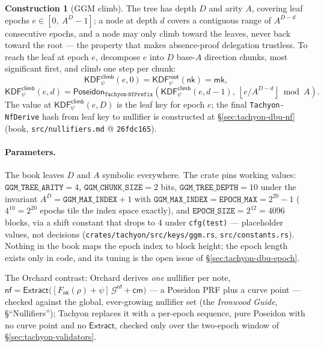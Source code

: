 \documentclass[11pt,a4paper]{article}
\theoremstyle{definition}
\newtheorem{construction}[theorem]{Construction}
\newcommand{\nfsym}{\mathsf{nf}}
\newcommand{\cmsym}{\mathsf{cm}}
\newcommand{\Extract}{\ensuremath{\mathsf{Extract}}}
\newcommand{\nksym}{\ensuremath{\mathsf{nk}}}
\begin{document}
\begin{construction}[GGM climb]\label{def:tachyon-design-climb}
The tree has depth $D$ and arity $A$, covering leaf epochs
$e \in [0,\ A^D - 1]$; a node at depth $d$ covers a contiguous range of
$A^{D-d}$ consecutive epochs, and a node may only climb toward the leaves,
never back toward the root --- the property that makes absence-proof
delegation trustless. To reach the leaf at epoch $e$, decompose $e$ into
$D$ base-$A$ direction chunks, most significant first, and
climb one step per chunk:
\[
\mathsf{KDF}^{\mathsf{climb}}_\psi(e, 0) =
  \mathsf{KDF}^{\mathsf{root}}_\psi(\nksym) = \mathsf{mk},
\]
\[
\mathsf{KDF}^{\mathsf{climb}}_\psi(e, d) =
  \mathsf{Poseidon}_{\texttt{Tachyon-NfPrefix}}\!\left(
    \mathsf{KDF}^{\mathsf{climb}}_\psi(e, d-1),\
    \left\lfloor e / A^{D-d} \right\rfloor \bmod A
  \right).
\]
The value at $\mathsf{KDF}^{\mathsf{climb}}_\psi(e, D)$ is the leaf key for
epoch $e$; the final \texttt{Tachyon-NfDerive} hash from leaf key to
nullifier is constructed at \S\ref{sec:tachyon-dbu-nf} (book,
\texttt{src/nullifiers.md} @ \texttt{26fdc165}).
\end{construction}

\paragraph{Parameters.} The book leaves $D$ and $A$ symbolic everywhere.
The crate pins working values: $\texttt{GGM\_TREE\_ARITY} = 4$,
$\texttt{GGM\_CHUNK\_SIZE} = 2$ bits, $\texttt{GGM\_TREE\_DEPTH} = 10$
under the invariant $A^D = \texttt{GGM\_MAX\_INDEX} + 1$ with
$\texttt{GGM\_MAX\_INDEX} = \texttt{EPOCH\_MAX} = 2^{20} - 1$ ($4^{10} =
2^{20}$ epochs tile the index space exactly), and $\texttt{EPOCH\_SIZE} =
2^{12} = 4096$ blocks, via a shift constant that drops to $4$ under
\texttt{cfg(test)} --- placeholder values, not decisions
(\texttt{crates/tachyon/src/keys/ggm.rs}, \texttt{src/constants.rs}).
Nothing in the book maps the epoch index to block height; the epoch length
exists only in code, and its tuning is the open issue of
\S\ref{sec:tachyon-dbu-epoch}.

The Orchard contrast: Orchard derives \emph{one} nullifier per note,
$\nfsym = \Extract\bigl([F_{\nksym}(\rho) + \psi]\,\mathcal{G}^{\nfsym} +
\cmsym\bigr)$ --- a Poseidon PRF plus a curve point --- checked against the
global, ever-growing nullifier set (the \emph{Ironwood Guide},
\S``Nullifiers''); Tachyon replaces it with
a per-epoch sequence, pure Poseidon with no curve point and no
$\Extract$, checked only over the two-epoch window of
\S\ref{sec:tachyon-validators}.
\end{document}
